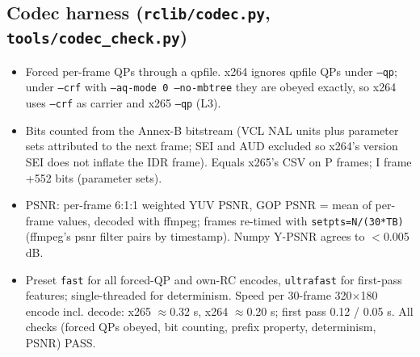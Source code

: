 \documentclass[10pt,a4paper]{article}
\newcommand{\code}[1]{\texttt{\small #1}}
\begin{document}
\subsection{Codec harness (\code{rclib/codec.py}, \code{tools/codec\_check.py})}
\begin{itemize}
\item Forced per-frame QPs through a qpfile. x264 ignores qpfile QPs under \code{--qp}; under \code{--crf} with
\code{--aq-mode 0 --no-mbtree} they are obeyed exactly, so x264 uses \code{--crf} as carrier and x265 \code{--qp} (L3).
\item Bits counted from the Annex-B bitstream (VCL NAL units plus parameter sets attributed to the next frame; SEI and
AUD excluded so x264's version SEI does not inflate the IDR frame). Equals x265's CSV on P frames; I frame +552 bits
(parameter sets).
\item PSNR: per-frame 6:1:1 weighted YUV PSNR, GOP PSNR = mean of per-frame values, decoded with ffmpeg; frames
re-timed with \code{setpts=N/(30*TB)} (ffmpeg's psnr filter pairs by timestamp). Numpy Y-PSNR agrees to $<$0.005 dB.
\item Preset \code{fast} for all forced-QP and own-RC encodes, \code{ultrafast} for first-pass features; single-threaded
for determinism. Speed per 30-frame 320$\times$180 encode incl. decode: x265 $\approx$0.32 s, x264 $\approx$0.20 s;
first pass 0.12 / 0.05 s. All checks (forced QPs obeyed, bit counting, prefix property, determinism, PSNR) PASS.
\end{itemize}

\end{document}
